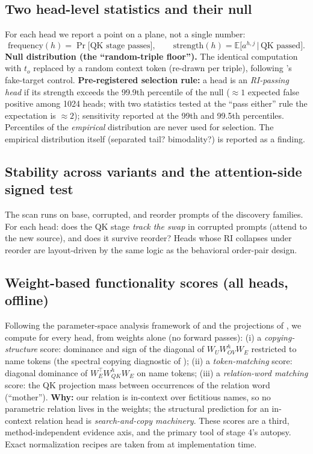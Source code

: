 \documentclass[11pt,a4paper]{article}
\begin{document}
\subsection{Two head-level statistics and their null}
For each head we report a point on a plane, not a single number:
\begin{equation}
\text{frequency}(h) = \Pr\big[\text{QK stage passes}\big], \qquad
\text{strength}(h) = \mathbb{E}\big[a^{h,j} \,\big|\, \text{QK passed}\big].
\end{equation}
\textbf{Null distribution (the ``random-triple floor'').} The identical computation with $t_o$ replaced by a random context token (re-drawn per triple), following \cite{ren}'s fake-target control. \textbf{Pre-registered selection rule:} a head is an \emph{RI-passing head} if its strength exceeds the 99.9th percentile of the null ($\approx 1$ expected false positive among 1024 heads; with two statistics tested at the ``pass either'' rule the expectation is $\approx 2$); sensitivity reported at the 99th and 99.5th percentiles. Percentiles of the \emph{empirical} distribution are never used for selection. The empirical distribution itself (separated tail? bimodality?) is reported as a finding.

\subsection{Stability across variants and the attention-side signed test}
The scan runs on base, corrupted, and reorder prompts of the discovery families. For each head: does the QK stage \emph{track the swap} in corrupted prompts (attend to the new source), and does it survive reorder? Heads whose RI collapses under reorder are layout-driven by the same logic as the behavioral order-pair design.

\subsection{Weight-based functionality scores (all heads, offline)}
Following the parameter-space analysis framework of \cite{maps} and the projections of \cite{framework}, we compute for every head, from weights alone (no forward passes):
(i) a \emph{copying-structure} score: dominance and sign of the diagonal of $W_U W^h_{OV} W_E$ restricted to name tokens (the spectral copying diagnostic of \cite{framework});
(ii) a \emph{token-matching} score: diagonal dominance of $W_E^{\top} W^h_{QK} W_E$ on name tokens;
(iii) a \emph{relation-word matching} score: the QK projection mass between occurrences of the relation word (``mother'').
\textbf{Why:} our relation is in-context over fictitious names, so no parametric relation lives in the weights; the structural prediction for an in-context relation head is \emph{search-and-copy machinery}. These scores are a third, method-independent evidence axis, and the primary tool of stage 4's autopsy. Exact normalization recipes are taken from \cite{maps} at implementation time.
\end{document}
